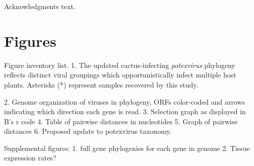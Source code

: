 \documentclass[fleqn,10pt,lineno]{wlpeerj}
\begin{document}
Acknowledgments text.

\clearpage
%




\pagebreak
\frenchspacing
\setlength{\parindent}{0.0in}

\section*{Figures}
Figure inventory list.
1. The updated cactus-infecting \textit{potexvirus} phylogeny reflects distinct viral groupings which opportunistically infect multiple host plants. Asterisks (*) represent samples recovered by this study. 

2. Genome organization of viruses in phylogeny, ORFs color-coded and arrows indicating which direction each gene is read.
3. Selection graph as displayed in B's r code
4. Table of pairwise distances in nucleotides
5. Graph of pairwise distances
6. Proposed update to potexvirus taxonomy.

Supplemental figures:
1. full gene phylogenies for each gene in genome
2. Tissue expression rates?




\end{document}
